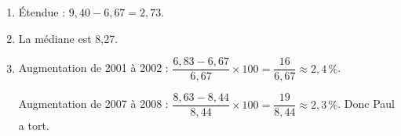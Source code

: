 \documentclass[10pt]{article}
\begin{document}
\begin{enumerate}
\item Étendue : $9,40 - 6,67 = 2,73$.
\item La médiane est 8,27.
\item Augmentation de 2001 à 2002 : $\dfrac{6,83 - 6,67}{6,67} \times 100 = \dfrac{16}{6,67} \approx 2,4\,\%$.

Augmentation de 2007 à 2008 : $\dfrac{8,63 - 8,44}{8,44} \times 100 = \dfrac{19}{8,44} \approx 2,3\,\%$. Donc Paul a tort.
\end{enumerate}

\medskip
\end{document}
